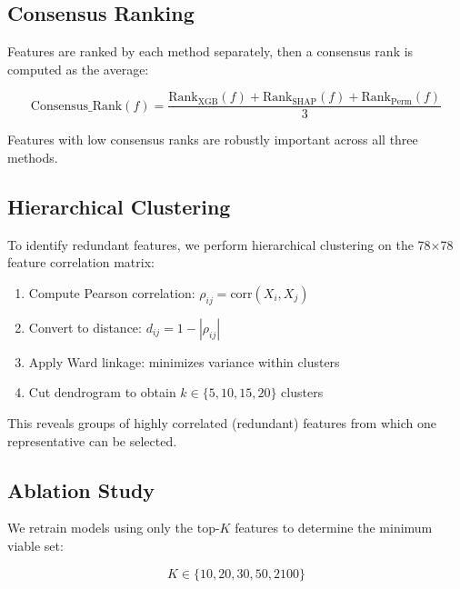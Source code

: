 \documentclass[11pt,a4paper]{article}
\begin{document}
\subsection{Consensus Ranking}

Features are ranked by each method separately, then a consensus rank is computed as the average:

\begin{equation}
  \text{Consensus\_Rank}(f) = \frac{\text{Rank}_{\text{XGB}}(f) + \text{Rank}_{\text{SHAP}}(f) + \text{Rank}_{\text{Perm}}(f)}{3}
\end{equation}

Features with low consensus ranks are robustly important across all three methods.

\subsection{Hierarchical Clustering}

To identify redundant features, we perform hierarchical clustering on the 78$\times$78 feature correlation matrix:

\begin{enumerate}
  \item Compute Pearson correlation: $\rho_{ij} = \text{corr}(X_i, X_j)$
  \item Convert to distance: $d_{ij} = 1 - |\rho_{ij}|$
  \item Apply Ward linkage: minimizes variance within clusters
  \item Cut dendrogram to obtain $k \in \{5, 10, 15, 20\}$ clusters
\end{enumerate}

This reveals groups of highly correlated (redundant) features from which one representative can be selected.

\subsection{Ablation Study}

We retrain models using only the top-$K$ features to determine the minimum viable set:

\begin{equation}
  K \in \{10, 20, 30, 50, 2100\}
\end{equation}
\end{document}
